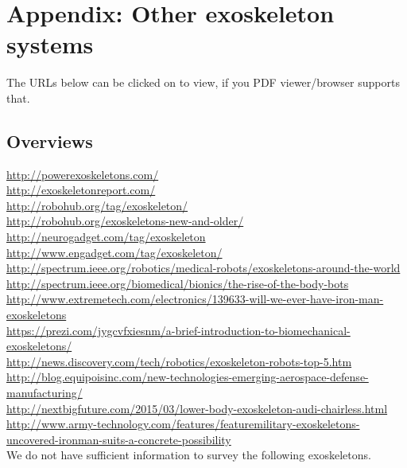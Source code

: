 
\section{Appendix: Other exoskeleton systems}

The URLs below can be clicked on to view, if you PDF viewer/browser supports that.

\subsection{Overviews}

\url{http://powerexoskeletons.com/}\\
\url{http://exoskeletonreport.com/}\\
\url{http://robohub.org/tag/exoskeleton/}\\
\url{http://robohub.org/exoskeletons-new-and-older/}\\
\url{http://neurogadget.com/tag/exoskeleton}\\
\url{http://www.engadget.com/tag/exoskeleton/}\\
\url{http://spectrum.ieee.org/robotics/medical-robots/exoskeletons-around-the-world}\\
\url{http://spectrum.ieee.org/biomedical/bionics/the-rise-of-the-body-bots}\\
\url{http://www.extremetech.com/electronics/139633-will-we-ever-have-iron-man-exoskeletons}\\
\url{https://prezi.com/jygcvfxiesnm/a-brief-introduction-to-biomechanical-exoskeletons/}\\
\url{http://news.discovery.com/tech/robotics/exoskeleton-robots-top-5.htm}\\
\url{http://blog.equipoisinc.com/new-technologies-emerging-aerospace-defense-manufacturing/}\\
\url{http://nextbigfuture.com/2015/03/lower-body-exoskeleton-audi-chairless.html}\\
\url{http://www.army-technology.com/features/featuremilitary-exoskeletons-uncovered-ironman-suits-a-concrete-possibility}\\


We do not have sufficient information to survey the following exoskeletons.


